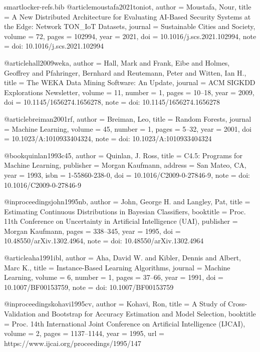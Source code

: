 \begin{filecontents*}[overwrite]{smartlocker-refs.bib}
@article{moustafa2021toniot,
  author  = {Moustafa, Nour},
  title   = {A New Distributed Architecture for Evaluating {AI}-Based Security Systems at the Edge: Network {TON\_IoT} Datasets},
  journal = {Sustainable Cities and Society},
  volume  = {72},
  pages   = {102994},
  year    = {2021},
  doi     = {10.1016/j.scs.2021.102994},
  note    = {doi: 10.1016/j.scs.2021.102994}
}

@article{hall2009weka,
  author  = {Hall, Mark and Frank, Eibe and Holmes, Geoffrey and Pfahringer, Bernhard and Reutemann, Peter and Witten, Ian H.},
  title   = {The {WEKA} Data Mining Software: An Update},
  journal = {ACM SIGKDD Explorations Newsletter},
  volume  = {11},
  number  = {1},
  pages   = {10--18},
  year    = {2009},
  doi     = {10.1145/1656274.1656278},
  note    = {doi: 10.1145/1656274.1656278}
}

@article{breiman2001rf,
  author  = {Breiman, Leo},
  title   = {Random Forests},
  journal = {Machine Learning},
  volume  = {45},
  number  = {1},
  pages   = {5--32},
  year    = {2001},
  doi     = {10.1023/A:1010933404324},
  note    = {doi: 10.1023/A:1010933404324}
}

@book{quinlan1993c45,
  author    = {Quinlan, J. Ross},
  title     = {C4.5: Programs for Machine Learning},
  publisher = {Morgan Kaufmann},
  address   = {San Mateo, CA},
  year      = {1993},
  isbn      = {1-55860-238-0},
  doi       = {10.1016/C2009-0-27846-9},
  note      = {doi: 10.1016/C2009-0-27846-9}
}

@inproceedings{john1995nb,
  author    = {John, George H. and Langley, Pat},
  title     = {Estimating Continuous Distributions in {Bayesian} Classifiers},
  booktitle = {Proc. 11th Conference on Uncertainty in Artificial Intelligence (UAI)},
  publisher = {Morgan Kaufmann},
  pages     = {338--345},
  year      = {1995},
  doi       = {10.48550/arXiv.1302.4964},
  note      = {doi: 10.48550/arXiv.1302.4964}
}

@article{aha1991ibl,
  author  = {Aha, David W. and Kibler, Dennis and Albert, Marc K.},
  title   = {Instance-Based Learning Algorithms},
  journal = {Machine Learning},
  volume  = {6},
  number  = {1},
  pages   = {37--66},
  year    = {1991},
  doi     = {10.1007/BF00153759},
  note    = {doi: 10.1007/BF00153759}
}

@inproceedings{kohavi1995cv,
  author    = {Kohavi, Ron},
  title     = {A Study of Cross-Validation and Bootstrap for Accuracy Estimation and Model Selection},
  booktitle = {Proc. 14th International Joint Conference on Artificial Intelligence (IJCAI)},
  volume    = {2},
  pages     = {1137--1144},
  year      = {1995},
  url       = {https://www.ijcai.org/proceedings/1995/147}
}


\end{filecontents*}
